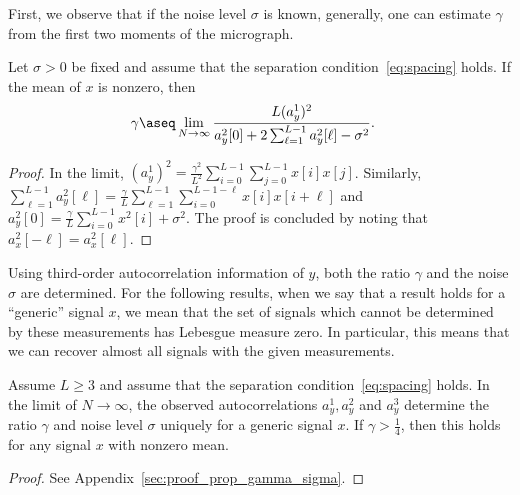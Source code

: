 \documentclass[9pt,twocolumn,twoside,lineno]{pnas-new}
\begin{document}
First, we observe that if the noise level $\sigma$ is known, generally, one can estimate $\gamma$ from the first two moments of the micrograph.
%
\begin{proposition} \label{prop:gamma}
	Let $\sigma > 0$ be fixed and assume that the separation condition~\eqref{eq:spacing} holds. If the mean of $x$ is nonzero, then 
	\begin{align*}
	\gamma & \aseq \lim_{N \to \infty}\frac{L (a^1_y)^2}{a_y^2[0] + 2\sum_{\ell = 1}^{L-1}a_y^2[\ell]-\sigma^2}.
	\end{align*}
\end{proposition}
\begin{proof}
In the limit, $(a^1_y)^2=\frac{\gamma^2}{L^2}\sum_{i=0}^{L-1}\sum_{j=0}^{L-1}x[i]x[j]$. Similarly,  $\sum_{\ell = 1}^{L-1}a_y^2[\ell]=\frac{\gamma}{L}\sum_{\ell = 1}^{L-1}\sum_{i=0}^{L-1-\ell}x[i]x[i+\ell]$ and $a_y^2[0]=\frac{\gamma}{L}\sum_{i=0}^{L-1}x^2[i] + \sigma^2$. The proof is concluded by noting that  $a_x^2[-\ell]=a_x^2[\ell]$. 
\end{proof}

Using third-order autocorrelation information of $y$, both the ratio $\gamma$ and the noise $\sigma$ are determined. For the following results, when we say that a result holds for a ``generic'' signal $x$, we mean that the set of signals which cannot be determined by these measurements
has Lebesgue measure zero. 
In particular, this means that we can recover
almost all signals with the given measurements.

\begin{proposition} \label{prop:gamma_sigma}
	Assume $L \geq 3$ and assume that the separation condition~\eqref{eq:spacing} holds. %
	In the limit of $N\to \infty$, the observed autocorrelations $a_y^1,a_y^2$ and  $a_y^3$ determine the ratio $\gamma$ and noise level $\sigma$ uniquely for a generic signal $x$. If $\gamma > \frac{1}{4}$, then this holds for any signal $x$ with nonzero mean. 
	\begin{proof}
		See Appendix~\ref{sec:proof_prop_gamma_sigma}.
	\end{proof}
\end{proposition}
\end{document}
